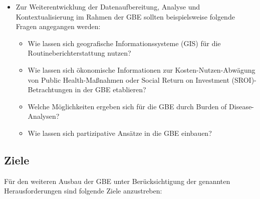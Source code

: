 \documentclass{article}
\begin{document}
\begin{itemize}
\item Zur Weiterentwicklung der Datenaufbereitung, Analyse und Kontextualisierung im Rahmen der GBE sollten beispielsweise folgende Fragen angegangen werden:

\begin{itemize}
\item Wie lassen sich geografische Informationssysteme (GIS) für die Routineberichterstattung nutzen?


\end{itemize}
\begin{itemize}
\item Wie lassen sich ökonomische Informationen zur Kosten-Nutzen-Abwägung von Public Health-Maßnahmen oder Social Return on Investment (SROI)-Betrachtungen in der GBE etablieren?


\end{itemize}
\begin{itemize}
\item Welche Möglichkeiten ergeben sich für die GBE durch Burden of Disease-Analysen?


\end{itemize}
\begin{itemize}
\item Wie lassen sich partizipative Ansätze in die GBE einbauen?


\end{itemize}

\end{itemize}

\subsection{Ziele}\label{H8368761}



Für den weiteren Ausbau der GBE unter Berücksichtigung der genannten Herausforderungen sind folgende Ziele anzustreben:
\end{document}
